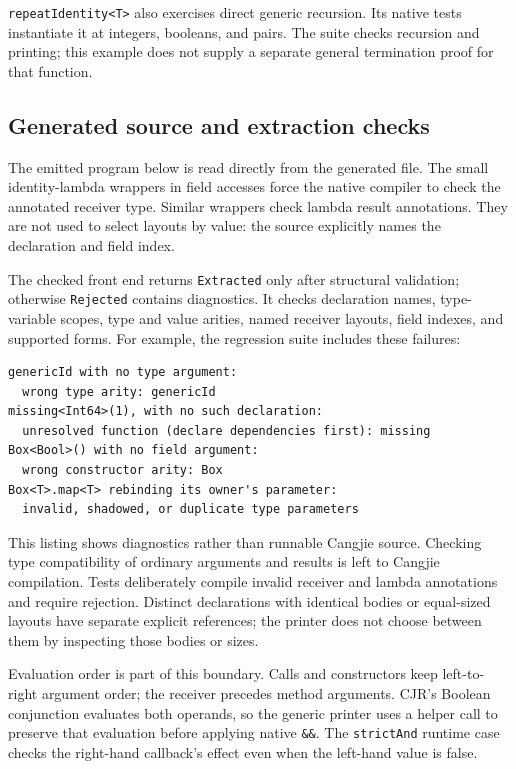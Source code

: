 \texttt{repeatIdentity<T>} also exercises direct generic recursion.
Its native tests instantiate it at integers, booleans, and pairs.
The suite checks recursion and printing; this example does not supply a
separate general termination proof for that function.

\subsection{Generated source and extraction checks}
\label{sec:generic-extraction}

The emitted program below is read directly from the generated file.
The small identity-lambda wrappers in field accesses force the native
compiler to check the annotated receiver type. Similar wrappers check
lambda result annotations. They are not used to select layouts by value:
the source explicitly names the declaration and field index.


The checked front end returns \texttt{Extracted} only after structural
validation; otherwise \texttt{Rejected} contains diagnostics. It checks
declaration names, type-variable scopes, type and value arities, named
receiver layouts, field indexes, and supported forms. For example, the
regression suite includes these failures:
\begin{lstlisting}
genericId with no type argument:
  wrong type arity: genericId
missing<Int64>(1), with no such declaration:
  unresolved function (declare dependencies first): missing
Box<Bool>() with no field argument:
  wrong constructor arity: Box
Box<T>.map<T> rebinding its owner's parameter:
  invalid, shadowed, or duplicate type parameters
\end{lstlisting}
This listing shows diagnostics rather than runnable Cangjie source.
Checking type compatibility of ordinary arguments and results is left
to Cangjie compilation. Tests deliberately compile invalid receiver and
lambda annotations and require rejection. Distinct declarations with
identical bodies or equal-sized layouts have separate explicit references;
the printer does not choose between them by inspecting those bodies or sizes.

Evaluation order is part of this boundary. Calls and constructors keep
left-to-right argument order; the receiver precedes method arguments.
CJR's Boolean conjunction evaluates both operands, so the generic printer
uses a helper call to preserve that evaluation before applying native
\texttt{\&\&}. The \texttt{strictAnd} runtime case checks the right-hand
callback's effect even when the left-hand value is false.


